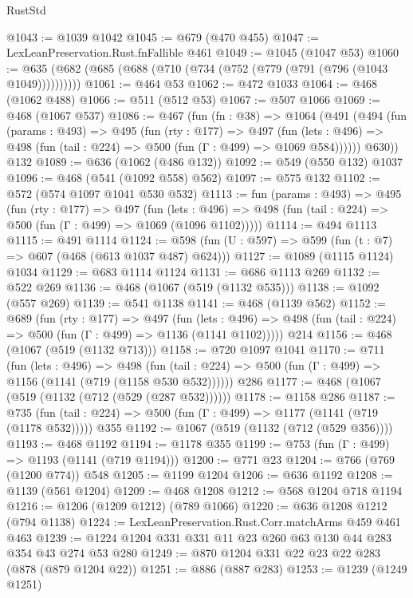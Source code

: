 \begin{lexlean}{RustStd}
\begin{coremodule}
@1043 := @1039 @1042
@1045 := @679 (@470 @455)
@1047 := LexLeanPreservation.Rust.fnFallible @461
@1049 := @1045 (@1047 @53)
@1060 := @635 (@682 (@685 (@688 (@710 (@734 (@752 (@779 (@791 (@796 (@1043 @1049))))))))))
@1061 := @464 @53
@1062 := @472 @1033
@1064 := @468 (@1062 @488)
@1066 := @511 (@512 @53)
@1067 := @507 @1066
@1069 := @468 (@1067 @537)
@1086 := @467
    (fun (fn : @38) =>
    @1064
      (@491
        (@494
          (fun (params : @493) =>
          @495
            (fun (rty : @177) =>
            @497
              (fun (lets : @496) =>
              @498 (fun (tail : @224) => @500 (fun (Γ : @499) => @1069 @584))))))
        @630))
    @132
@1089 := @636 (@1062 (@486 @132))
@1092 := @549 (@550 @132) @1037
@1096 := @468 (@541 (@1092 @558) @562)
@1097 := @575 @132
@1102 := @572 (@574 @1097 @1041 @530 @532)
@1113 := fun (params : @493) =>
  @495
    (fun (rty : @177) =>
    @497
      (fun (lets : @496) =>
      @498 (fun (tail : @224) => @500 (fun (Γ : @499) => @1069 (@1096 @1102)))))
@1114 := @494 @1113
@1115 := @491 @1114
@1124 := @598 (fun (U : @597) => @599 (fun (t : @7) => @607 (@468 (@613 @1037 @487) @624)))
@1127 := @1089 (@1115 @1124) @1034
@1129 := @683 @1114 @1124
@1131 := @686 @1113 @269
@1132 := @522 @269
@1136 := @468 (@1067 (@519 (@1132 @535)))
@1138 := @1092 (@557 @269)
@1139 := @541 @1138
@1141 := @468 (@1139 @562)
@1152 := @689
    (fun (rty : @177) =>
    @497
      (fun (lets : @496) =>
      @498 (fun (tail : @224) => @500 (fun (Γ : @499) => @1136 (@1141 @1102)))))
    @214
@1156 := @468 (@1067 (@519 (@1132 @713)))
@1158 := @720 @1097 @1041
@1170 := @711
    (fun (lets : @496) =>
    @498 (fun (tail : @224) => @500 (fun (Γ : @499) => @1156 (@1141 (@719 (@1158 @530 @532))))))
    @286
@1177 := @468 (@1067 (@519 (@1132 (@712 (@529 (@287 @532))))))
@1178 := @1158 @286
@1187 := @735 (fun (tail : @224) => @500 (fun (Γ : @499) => @1177 (@1141 (@719 (@1178 @532))))) @355
@1192 := @1067 (@519 (@1132 (@712 (@529 @356))))
@1193 := @468 @1192
@1194 := @1178 @355
@1199 := @753 (fun (Γ : @499) => @1193 (@1141 (@719 @1194)))
@1200 := @771 @23
@1204 := @766 (@769 (@1200 @774)) @548
@1205 := @1199 @1204
@1206 := @636 @1192
@1208 := @1139 (@561 @1204)
@1209 := @468 @1208
@1212 := @568 @1204 @718 @1194
@1216 := @1206 (@1209 @1212) (@789 @1066)
@1220 := @636 @1208 @1212 (@794 @1138)
@1224 := LexLeanPreservation.Rust.Corr.matchArms @459 @461 @463
@1239 := @1224 @1204 @331 @331 @11 @23 @260 @63 @130 @44 @283 @354 @43 @274 @53 @280
@1249 := @870 @1204 @331 @22 @23 @22 @283 (@878 (@879 @1204 @22))
@1251 := @886 (@887 @283)
@1253 := @1239 (@1249 @1251)

\end{coremodule}
\end{lexlean}
